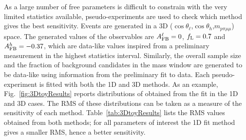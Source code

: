 As a large number of free parameters is difficult to constrain with the very limited statistics available, 
%
pseudo-experiments are used to check which method gives the best sensitivity.
Events are generated in a 3D ($\cos\theta_\ell$,$\cos\theta_h$,$m_{p\pi\mu\mu}$) space.
The generated values of the observables are $A_{\rm FB}^\ell = 0$, $f_{\rm L} = 0.7$ 
and $A_{\rm FB}^h = -0.37$, which are data-like values inspired from a preliminary measurement
in the highest statistics interval. Similarly, the overall sample size and the fraction of background candidates
in the mass window are generated to be data-like using information from the preliminary fit to data.
%
Each pseudo-experiment is fitted with both the 1D and 3D methods. As an example, Fig.~\ref{fig:3DtoyResults} 
reports distributions of \afbl obtained from the fit in the 1D and 3D cases.
The RMS of these distributions can be taken as a measure of the sensitivity of each method.
Table~\ref{tab:3DtoyResults} lists the RMS values obtained from both methods; for all parameters 
of interest the 1D fit method gives a smaller RMS, hence a better sensitivity.
%
\begin{table}[hb]
\centering
\caption{RMS values for pseudo-experiments on the extraction of the three parameters
of interests with the 1D and 3D fitting methods.}
\label{tab:3DtoyResults}
\end{table}

